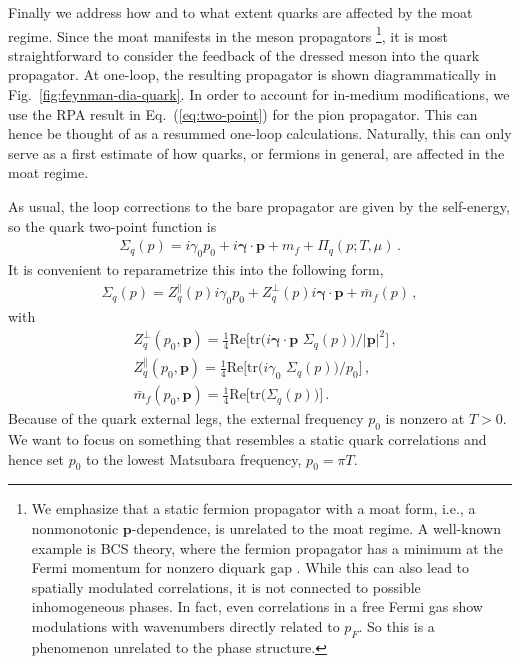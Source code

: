 \documentclass[reprint,english,superscriptaddress,preprintnumbers,amsmath,amssymb,aps,prd]{revtex4-2}
\def\Eq#1{Eq.~(\ref{#1})}
\def\Fig#1{Fig.~\ref{#1}}
\begin{document}
Finally we address how and to what extent quarks are affected by the moat regime. 
Since the moat manifests in the meson propagators \footnote{We emphasize that a static fermion propagator with a moat form, i.e., a nonmonotonic $\boldsymbol{p}$-dependence, is unrelated to the moat regime. A well-known example is BCS theory, where the fermion propagator has a minimum at the Fermi momentum for nonzero diquark gap \cite{Casalbuoni:2018haw}. While this can also lead to spatially modulated correlations, it is not connected to possible inhomogeneous phases. In fact, even correlations in a free Fermi gas show modulations with wavenumbers directly related to $p_F$. So this is a phenomenon unrelated to the phase structure.}, it is most straightforward to consider the feedback of the dressed meson into the quark propagator. At one-loop, the resulting propagator is shown diagrammatically in \Fig{fig:feynman-dia-quark}. In order to account for in-medium modifications, we use the RPA result in \Eq{eq:two-point} for the pion propagator. This can hence be thought of as a resummed one-loop calculations. Naturally, this can only serve as a first estimate of how quarks, or fermions in general, are affected in the moat regime.

As usual, the loop corrections to the bare propagator are given by the self-energy, so the quark two-point function is
%
\begin{align}\label{eq:quark_two_point}
\Sigma_q(p)=i\gamma_0 p_0+i\boldsymbol{\gamma}\cdot\mathbf{p}+m_f+\Pi_q(p;T,\mu)\,.
\end{align}
%
It is convenient to reparametrize this into the following form,
%
\begin{align}\label{eq:gamma_q}
\Sigma_q(p)=Z^\|_q(p)i\gamma_0p_0+Z^\perp_q(p)i\boldsymbol{\gamma}\cdot\boldsymbol{p}+\bar m_f(p)\,,
\end{align}
%
with
%
\begin{align}\label{eq:Zs}
  &Z^\perp_q(p_0,\boldsymbol{p})=\frac{1}{4}\mathrm{Re}\bigg[\mathrm{tr}\bigg(i\boldsymbol{\gamma}\cdot\boldsymbol{p}\,\,\Sigma_q(p)\bigg)/|\boldsymbol{p}|^2\bigg]\,,\\[2ex]
  &Z^\|_q(p_0,\boldsymbol{p})=\frac{1}{4}\mathrm{Re}\bigg[\mathrm{tr}\bigg(i\gamma_0\,\,\Sigma_q(p)\bigg)/p_0\bigg]\,\label{eq:Z0},\\[2ex]
  &\bar m_f(p_0,\boldsymbol{p})=\frac{1}{4}\mathrm{Re}\bigg[\mathrm{tr}\bigg(\Sigma_q(p)\bigg)\bigg]\label{eq:mf}\,.
\end{align}
%
Because of the quark external legs, the external frequency $p_0$ is nonzero at $T>0$. We want to focus on something that resembles a static quark correlations and hence set $p_0$ to the lowest Matsubara frequency, $p_0=\pi T$.
\end{document}
